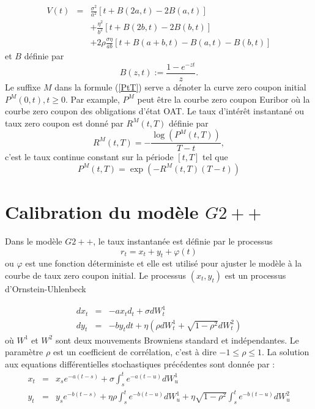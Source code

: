 \documentclass[12pt, a4paper]{book}
\begin{document}
\begin{eqnarray}
V(t)&=&\frac{\sigma^2}{a^2}\left[ t+B(2a,t)-2B(a,t)\right]\nonumber\\
& &+\frac{\eta^2}{b^2}\left[ t+B(2b,t)-2B(b,t)\right]\nonumber\\
& &+2\rho\frac{\sigma\eta}{ab}\left[ t+B(a+b,t)-B(a,t)-B(b,t)\right]\label{Vt}
\end{eqnarray}
et $B$ définie par
\begin{equation}
\label{B(z,t)}
B(z,t) := \frac{1-e^{-zt}}{z}.
\end{equation}
Le suffixe $M$ dans la formule (\ref{PtT}) serve a dénoter la curve zero coupon initial $P^M(0,t), t\geq 0$. Par example, $P^M$ peut être la courbe zero coupon Euribor où la courbe zero coupon des obligations d'état OAT.
Le taux d'intérêt instantané ou taux zero coupon est donné par $R^M(t,T)$ définie par
\begin{equation}
\label{RtT}
R^M(t,T) = -\frac{\log(P^M(t,T))}{T-t},
\end{equation}
c'est le taux continue constant sur la période $[t,T]$ tel que
$$ P^M(t,T) = \exp(-R^M(t,T)(T-t) ) $$

\section{Calibration du modèle $G2++$}
\label{calibration}
Dans le modèle $G2++$, le taux instantanée est définie par le processus
$$ r_t = x_t + y_t +\varphi (t) $$
ou $\varphi$ est une fonction déterministe et elle est utilisé pour ajuster le modèle à la courbe de taux zero coupon initial. Le processus $(x_t, y_t)$ est un processus d'Ornstein-Uhlenbeck

\begin{eqnarray}
dx_t &=& -ax_td_t +\sigma dW_t^1\nonumber\\
dy_t &=& -by_t dt +\eta (\rho dW_t^1 +\sqrt{1-\rho ^2}d W_t^2) \nonumber
\end{eqnarray}
où $W^1$ et $W^2$ sont deux mouvements Browniens standard et indépendantes. Le paramètre $\rho$ est un coefficient de corrélation, c'est à dire $-1\leq \rho \leq 1$. La solution aux equations différentielles stochastiques précédentes sont donnée par :
\begin{eqnarray}
x_t &=& x_s e^{-a(t-s)} +\sigma \int_s^t e^{-a(t-u)}dW^1_u\label{x_t}\\
y_t &=& y_s e^{-b(t-s)} +\eta\rho \int_s^t e^{-b(t-u)}dW^1_u+\eta\sqrt{1-\rho ^2}\int_s^t e^{-b(t-u)}dW^2_u\label{y_t}
\end{eqnarray}
\end{document}
